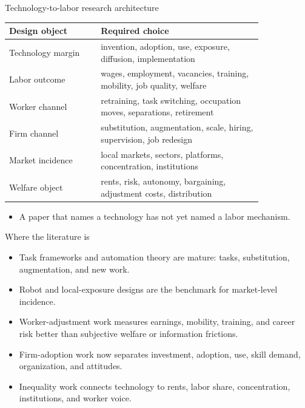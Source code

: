 \documentclass[aspectratio=169,11pt]{beamer}
\begin{document}
\begin{frame}{Technology-to-labor research architecture}
\small
\begin{tabular}{p{0.30\linewidth} p{0.53\linewidth}}
\toprule
Design object & Required choice \\
\midrule
Technology margin & invention, adoption, use, exposure, diffusion, implementation \\
Labor outcome & wages, employment, vacancies, training, mobility, job quality, welfare \\
Worker channel & retraining, task switching, occupation moves, separations, retirement \\
Firm channel & substitution, augmentation, scale, hiring, supervision, job redesign \\
Market incidence & local markets, sectors, platforms, concentration, institutions \\
Welfare object & rents, risk, autonomy, bargaining, adjustment costs, distribution \\
\bottomrule
\end{tabular}
\vspace{0.25cm}
\begin{itemize}
    \item A paper that names a technology has not yet named a labor mechanism.
\end{itemize}
\end{frame}

\begin{frame}{Where the literature is}
\begin{itemize}
    \item Task frameworks and automation theory are mature: tasks, substitution, augmentation, and new work.
    \item Robot and local-exposure designs are the benchmark for market-level incidence.
    \item Worker-adjustment work measures earnings, mobility, training, and career risk better than subjective welfare or information frictions.
    \item Firm-adoption work now separates investment, adoption, use, skill demand, organization, and attitudes.
    \item Inequality work connects technology to rents, labor share, concentration, institutions, and worker voice.
\end{itemize}
\end{frame}
\end{document}
